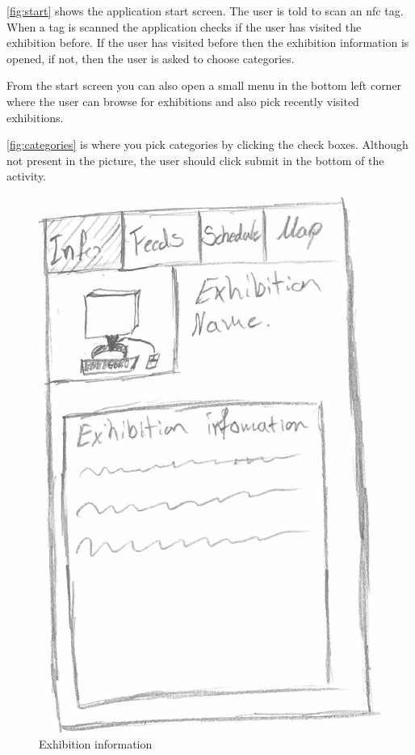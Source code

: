 \autoref{fig:start} shows the application start screen. The user is told to scan an \ac{nfc} tag. When a tag is scanned the application checks if the user has visited the exhibition before. If the user has visited before then the exhibition information is opened, if not, then the user is asked to choose categories.

From the start screen you can also open a small menu in the bottom left corner where the user can browse for exhibitions and also pick recently visited exhibitions.

\autoref{fig:categories} is where you pick categories by clicking the check boxes. Although not present in the picture, the user should click submit in the bottom of the activity.

\begin{figure}[H]
\begin{minipage}[b]{0.5\columnwidth}
\centering
\includegraphics[width=0.7\columnwidth]{img/prototype/3.png}
\caption{Exhibition information\label{fig:exhibition}}
\end{minipage}
\hspace{0.5cm}
\begin{minipage}[b]{0.5\columnwidth}
\centering

\end{minipage}
\end{figure}
